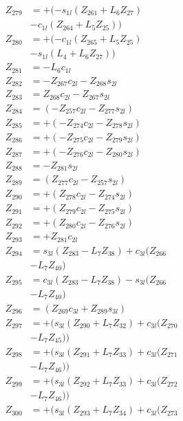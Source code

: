 \begin{multicols}{2}
\begin{align}
Z_{279} &=  + (- s_{1l}(Z_{261} + L_6Z_{27})  \nonumber \\
&- c_{1l}(Z_{264} + L_5Z_{25})) \nonumber \\
Z_{280} &=  + (- c_{1l}(Z_{265} + L_5Z_{25})  \nonumber \\
&- s_{1l}(L_4 + L_6Z_{27})) \nonumber \\
Z_{281} &=  - L_6c_{1l} \nonumber \\
Z_{282} &= - Z_{267}c_{2l} - Z_{268}s_{2l} \nonumber \\
Z_{283} &=   Z_{268}c_{2l} - Z_{267}s_{2l} \nonumber \\
Z_{284} &= (- Z_{257}c_{2l} - Z_{277}s_{2l}) \nonumber \\
Z_{285} &= + (- Z_{274}c_{2l} - Z_{278}s_{2l}) \nonumber \\
Z_{286} &= + (- Z_{275}c_{2l} - Z_{279}s_{2l}) \nonumber \\
Z_{287} &= + (- Z_{276}c_{2l} - Z_{280}s_{2l}) \nonumber \\
Z_{288} &= - Z_{281}s_{2l} \nonumber \\
Z_{289} &= (Z_{277}c_{2l} - Z_{257}s_{2l}) \nonumber \\
Z_{290} &= + (Z_{278}c_{2l} - Z_{274}s_{2l}) \nonumber \\
Z_{291} &= + (Z_{279}c_{2l} - Z_{275}s_{2l}) \nonumber \\
Z_{292} &= + (Z_{280}c_{2l} - Z_{276}s_{2l}) \nonumber \\
Z_{293} &= + Z_{281}c_{2l} \nonumber \\
Z_{294} &= s_{3l}(Z_{283} - L_7Z_{38}) + c_{3l}(Z_{266}  \nonumber \\
&- L_7Z_{40}) \nonumber \\
Z_{295} &= c_{3l}(Z_{283} - L_7Z_{38}) - s_{3l}(Z_{266}  \nonumber \\
&- L_7Z_{40}) \nonumber \\
Z_{296} &= (Z_{269}c_{3l} + Z_{289}s_{3l}) \nonumber \\
Z_{297} &= + (s_{3l}(Z_{290} + L_7Z_{32}) + c_{3l}(Z_{270}  \nonumber \\
&- L_7Z_{45})) \nonumber \\
Z_{298} &= + (s_{3l}(Z_{291} + L_7Z_{33}) + c_{3l}(Z_{271}  \nonumber \\
&- L_7Z_{46})) \nonumber \\
Z_{299} &= + (s_{3l}(Z_{292} + L_7Z_{33}) + c_{3l}(Z_{272}  \nonumber \\
&- L_7Z_{46})) \nonumber \\
Z_{300} &= + (s_{3l}(Z_{293} + L_7Z_{34}) + c_{3l}(Z_{273}  \nonumber \\

\end{align}
\end{multicols}
